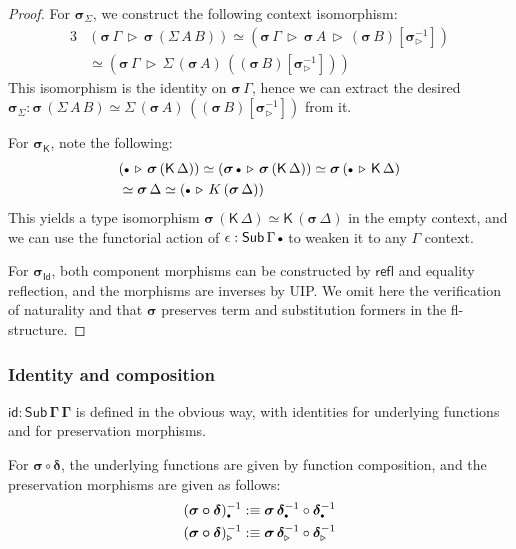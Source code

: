\documentclass[12pt,a4paper,twoside,openany]{book}
\theoremstyle{remark}
\theoremstyle{definition}
\theoremstyle{theorem}
\newcommand{\bs}[1]{\boldsymbol{#1}}
\newcommand{\refl}{\mathsf{refl}}
\newcommand{\id}{\mathsf{id}}
\newcommand{\Sub}{\mathsf{Sub}}
\newcommand{\Id}{\mathsf{Id}}
\newcommand{\ext}{\triangleright}
\newcommand{\emptycon}{\scaleobj{.75}\bullet}
\newcommand{\K}{\mathsf{K}}
\newcommand{\bSub}{\bs{\Sub}}
\newcommand{\bGamma}{\bs{\Gamma}}
\newcommand{\bsigma}{\bs{\sigma}}
\newcommand{\bdelta}{\bs{\delta}}
\newcommand{\bid}{\bs{\id}}
\newcommand{\defn}{:\equiv}
\begin{document}
\begin{proof}
For $\bsigma_{\Sigma}$, we construct the following context isomorphism:
\begin{alignat*}{3}
& (\bsigma\,\Gamma\,\ext\,\bsigma\,(\Sigma\,A\,B)) \simeq
  (\bsigma\,\Gamma\,\ext\,\bsigma\,A\,\ext\,(\bsigma\,B)[\bsigma_{\ext}^{-1}]) \\
& \simeq (\bsigma\,\Gamma\,\ext\,\Sigma\,(\bsigma\,A)\,((\bsigma\,B)[\bsigma_{\ext}^{-1}]))
\end{alignat*}
This isomorphism is the identity on $\bsigma\,\Gamma$, hence we can extract the
desired $\bsigma_{\Sigma} : \bsigma\,(\Sigma\,A\,B) \simeq
\Sigma\,(\bsigma\,A)\,((\bsigma\,B)[\bsigma_{\ext}^{-1}])$ from it.

For $\bsigma_{\K}$, note the following:
\begin{alignat*}{3}
  & (\emptycon\,\ext\,\bsigma\,(\K\,\Delta)) \simeq
    (\bsigma\,\emptycon\,\ext\,\bsigma\,(\K\,\Delta)) \simeq
    \bsigma\,(\emptycon\,\ext\,\K\,\Delta)\\
  & \simeq \bsigma\,\Delta \simeq (\emptycon\,\ext\,K\,(\bsigma\,\Delta))
\end{alignat*}
This yields a type isomorphism $\bsigma\,(\K\,\Delta) \simeq
\K\,(\bsigma\,\Delta)$ in the empty context, and we can use the functorial action of
$\epsilon : \Sub\,\Gamma\,\emptycon$ to weaken it to any $\Gamma$ context.

For $\bsigma_{\Id}$, both component morphisms can be constructed by $\refl$ and
equality reflection, and the morphisms are inverses by UIP. We omit here the
verification of naturality and that $\bsigma$ preserves term and substitution
formers in the fl-structure.
\end{proof}

\subsubsection{Identity and composition}
\label{sec:idcomp}

$\bid : \bSub\,\bGamma\,\bGamma$ is defined in the obvious way, with identities for
underlying functions and for preservation morphisms.

For $\bs{\sigma \circ \delta}$, the underlying functions are given by
function composition, and the preservation morphisms are given as follows:
\begin{alignat*}{3}
  & (\bs{\sigma \circ \delta})_{\emptycon}^{-1} \defn
    \bsigma\,\bdelta_{\emptycon}^{-1} \circ \bdelta_{\emptycon}^{-1} \\
  & (\bs{\sigma \circ \delta})_{\ext}^{-1} \defn
    \bsigma\,\bdelta_{\ext}^{-1} \circ \bdelta_{\ext}^{-1}
\end{alignat*}
\end{document}
